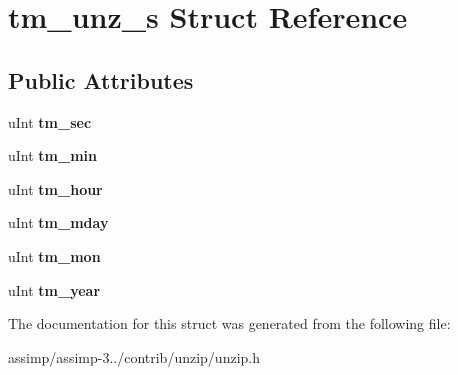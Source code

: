 \hypertarget{structtm__unz__s}{\section{tm\+\_\+unz\+\_\+s Struct Reference}
\label{structtm__unz__s}
}
\subsection*{Public Attributes}
\begin{DoxyCompactItemize}
\item 
\hypertarget{structtm__unz__s_ab91e69a9869e5db5be51b1aebaa5ea0d}{u\+Int {\bfseries tm\+\_\+sec}}\label{structtm__unz__s_ab91e69a9869e5db5be51b1aebaa5ea0d}

\item 
\hypertarget{structtm__unz__s_ac5a6bf08a4c5db8ae2243d4f0c35b192}{u\+Int {\bfseries tm\+\_\+min}}\label{structtm__unz__s_ac5a6bf08a4c5db8ae2243d4f0c35b192}

\item 
\hypertarget{structtm__unz__s_ada09255f794d6c2db07ef73b77266b9c}{u\+Int {\bfseries tm\+\_\+hour}}\label{structtm__unz__s_ada09255f794d6c2db07ef73b77266b9c}

\item 
\hypertarget{structtm__unz__s_a51ed1873e1dcabf08ff0f85caf8aefee}{u\+Int {\bfseries tm\+\_\+mday}}\label{structtm__unz__s_a51ed1873e1dcabf08ff0f85caf8aefee}

\item 
\hypertarget{structtm__unz__s_a4f5e461d8cad18d1aff7ec012168111d}{u\+Int {\bfseries tm\+\_\+mon}}\label{structtm__unz__s_a4f5e461d8cad18d1aff7ec012168111d}

\item 
\hypertarget{structtm__unz__s_a5f17147e3cfbbfdbeb2e29cbc1df8136}{u\+Int {\bfseries tm\+\_\+year}}\label{structtm__unz__s_a5f17147e3cfbbfdbeb2e29cbc1df8136}

\end{DoxyCompactItemize}


The documentation for this struct was generated from the following file\+:\begin{DoxyCompactItemize}
\item 
assimp/assimp-\/3../contrib/unzip/unzip.\+h\end{DoxyCompactItemize}
